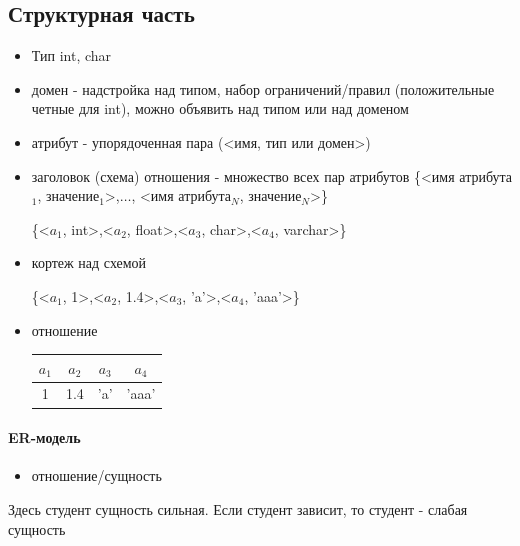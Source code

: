 \documentclass[a4paper, 14pt]{report}
\begin{document}
\subsection{Структурная часть}

\begin{itemize}
    \item Тип int, char
    \item домен - надстройка над типом, набор ограничений/правил (положительные четные для int), можно объявить над типом или над доменом
    \item атрибут - упорядоченная пара (<имя, тип или домен>)
    \item заголовок (схема) отношения - множество всех пар атрибутов \{<имя атрибута$_1$, значение$_1$>,$\dots$, <имя атрибута$_N$, значение$_N$>\}

        \{<$a_1$, int>,<$a_2$, float>,<$a_3$, char>,<$a_4$, varchar>\}
    \item кортеж над схемой

        \{<$a_1$, 1>,<$a_2$, 1.4>,<$a_3$, 'a'>,<$a_4$, 'aaa'>\}
    \item отношение

        \begin{tabular}{|c|c|c|c|}
            \hline
            $a_1$ & $a_2$ & $a_3$ & $a_4$ \\
            \hline
            1 & 1.4 & 'a' & 'aaa' \\
            \hline
        \end{tabular}
\end{itemize}


\paragraph{ER-модель}

\begin{itemize}
    \item отношение/сущность

\end{itemize}

Здесь студент сущность сильная. Если студент зависит, то студент - слабая сущность
\end{document}

